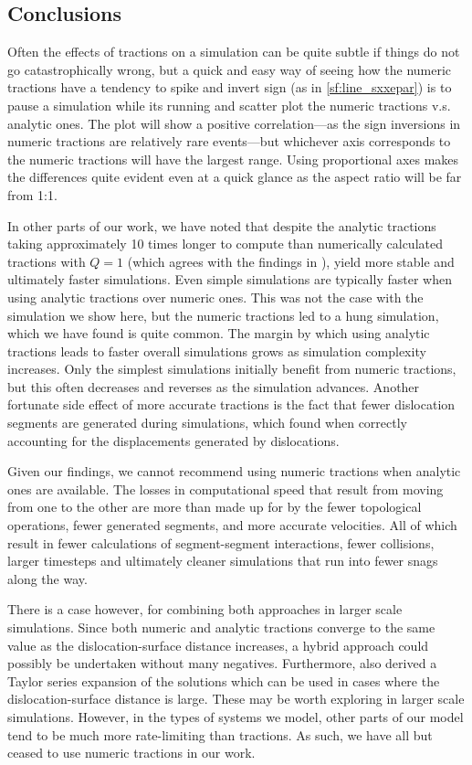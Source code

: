 \subsection{Conclusions}\label{ss:paperConclusion}

Often the effects of tractions on a simulation can be quite subtle if things do not go catastrophically wrong, but a quick and easy way of seeing how the numeric tractions have a tendency to spike and invert sign (as in \cref{sf:line_sxxepar}) is to pause a simulation while its running and scatter plot the numeric tractions v.s. analytic ones. The plot will show a positive correlation---as the sign inversions in numeric tractions are relatively rare events---but whichever axis corresponds to the numeric tractions will have the largest range. Using proportional axes makes the differences quite evident even at a quick glance as the aspect ratio will be far from 1:1.

In other parts of our work, we have noted that despite the analytic tractions taking approximately 10 times longer to compute than numerically calculated tractions with $Q = 1$ (which agrees with the findings in \cite{analytic_tractions}), yield more stable and ultimately faster simulations. Even simple simulations are typically faster when using analytic tractions over numeric ones. This was not the case with the simulation we show here, but the numeric tractions led to a hung simulation, which we have found is quite common. The margin by which using analytic tractions leads to faster overall simulations grows as simulation complexity increases. Only the simplest simulations initially benefit from numeric tractions, but this often decreases and reverses as the simulation advances. Another fortunate side effect of more accurate tractions is the fact that fewer dislocation segments are generated during simulations, which \citet{bromage2018calculating} found when correctly accounting for the displacements generated by dislocations.

Given our findings, we cannot recommend using numeric tractions when analytic ones are available. The losses in computational speed that result from moving from one to the other are more than made up for by the fewer topological operations, fewer generated segments, and more accurate velocities. All of which result in fewer calculations of segment-segment interactions, fewer collisions, larger timesteps and ultimately cleaner simulations that run into fewer snags along the way.

There is a case however, for combining both approaches in larger scale simulations. Since both numeric and analytic tractions converge to the same value as the dislocation-surface distance increases, a hybrid approach could possibly be undertaken without many negatives. Furthermore, \cite{analytic_tractions} also derived a Taylor series expansion of the solutions which can be used in cases where the dislocation-surface distance is large. These may be worth exploring in larger scale simulations. However, in the types of systems we model, other parts of our model tend to be much more rate-limiting than tractions. As such, we have all but ceased to use numeric tractions in our work.

